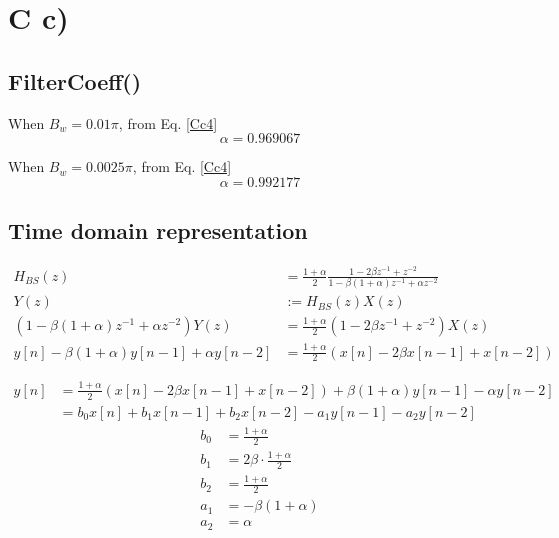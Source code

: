 \documentclass{article}
\newenvironment{homeworkProblem}[1]{
	\section*{#1}
	}{
}
\newenvironment{homeworkSection}[1]{
	\subsection*{#1}
	}{
}
\begin{document}
\begin{homeworkProblem}{C c)}
\begin{homeworkSection}{FilterCoeff()}
When $B_w = 0.01\pi$, from Eq. \ref{Cc4}
\begin{equation}
\alpha = 0.969067
\end{equation}

When $B_w = 0.0025\pi$, from Eq. \ref{Cc4}
\begin{equation}
\alpha = 0.992177
\end{equation}

\end{homeworkSection}


\begin{homeworkSection}{Time domain representation}

\begin{align*}
H_{BS}(z) &= \frac{1+\alpha}{2} \frac{1-2\beta z^{-1} + z^{-2}}{1 - \beta (1+\alpha) z^{-1} + \alpha z^{-2}}\\
Y(z) &:= H_{BS}(z) X(z)\\
(1 - \beta (1+\alpha) z^{-1} + \alpha z^{-2}) Y(z) &= \frac{1+\alpha}{2} (1 - 2 \beta z^{-1} + z^{-2}) X(z)\\
y[n] - \beta (1+\alpha) y[n-1] + \alpha y[n-2] &= \frac{1+\alpha}{2} (x[n] - 2 \beta x[n-1] + x[n-2])
\end{align*}

\begin{align*}
y[n] &= \frac{1+\alpha}{2} (x[n] - 2 \beta x[n-1] + x[n-2]) + \beta (1+\alpha) y[n-1] - \alpha y[n-2]\\
&= b_0 x[n] + b_1 x[n-1] + b_2 x[n-2] - a_1 y[n-1] - a_2 y[n-2]
\end{align*}
\begin{align*}
b_0 &= \frac{1+\alpha}{2}\\
b_1 &= 2 \beta \cdot \frac{1+\alpha}{2}\\
b_2 &= \frac{1+\alpha}{2}\\
a_1 &= - \beta (1+\alpha)\\
a_2 &= \alpha
\end{align*}

\end{homeworkSection}


\end{homeworkProblem}

\end{document}
